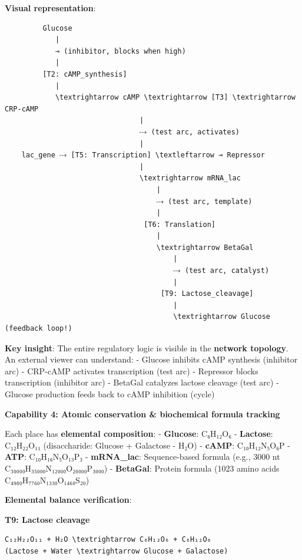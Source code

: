 \textbf{Visual representation}:

\begin{lstlisting}
         Glucose
            |
            ⊸ (inhibitor, blocks when high)
            |
         [T2: cAMP_synthesis]
            |
            \textrightarrow cAMP \textrightarrow [T3] \textrightarrow CRP-cAMP
                                |
                                ⤏ (test arc, activates)
                                |
    lac_gene ⤏ [T5: Transcription] \textleftarrow ⊸ Repressor
                                |
                                \textrightarrow mRNA_lac
                                    |
                                    ⤏ (test arc, template)
                                    |
                                 [T6: Translation]
                                    |
                                    \textrightarrow BetaGal
                                        |
                                        ⤏ (test arc, catalyst)
                                        |
                                     [T9: Lactose_cleavage]
                                        |
                                        \textrightarrow Glucose (feedback loop!)
\end{lstlisting}

\textbf{Key insight}: The entire regulatory logic is visible in the
\textbf{network topology}. An external viewer can understand: - Glucose
inhibits cAMP synthesis (inhibitor arc) - CRP-cAMP activates
transcription (test arc) - Repressor blocks transcription (inhibitor
arc) - BetaGal catalyzes lactose cleavage (test arc) - Glucose
production feeds back to cAMP inhibition (cycle)

\textbf{Capability 4: Atomic conservation \& biochemical formula
tracking}

Each place has \textbf{elemental composition}: - \textbf{Glucose}:
C₆H₁₂O₆ - \textbf{Lactose}: C₁₂H₂₂O₁₁ (disaccharide: Glucose + Galactose
- H₂O) - \textbf{cAMP}: C₁₀H₁₂N₅O₆P - \textbf{ATP}: C₁₀H₁₆N₅O₁₃P₃ -
\textbf{mRNA\_lac}: Sequence-based formula (e.g., 3000 nt \textrightarrow
C₃₀₀₀₀H₃₅₀₀₀N₁₂₀₀₀O₂₀₀₀₀P₃₀₀₀) - \textbf{BetaGal}: Protein formula (1023
amino acids \textrightarrow C₄₉₈₀H₇₇₆₀N₁₃₃₀O₁₄₆₀S₂₀)

\textbf{Elemental balance verification}:

\textbf{T9: Lactose cleavage}

\begin{lstlisting}
C₁₂H₂₂O₁₁ + H₂O \textrightarrow C₆H₁₂O₆ + C₆H₁₂O₆
(Lactose + Water \textrightarrow Glucose + Galactose)
\end{lstlisting}

